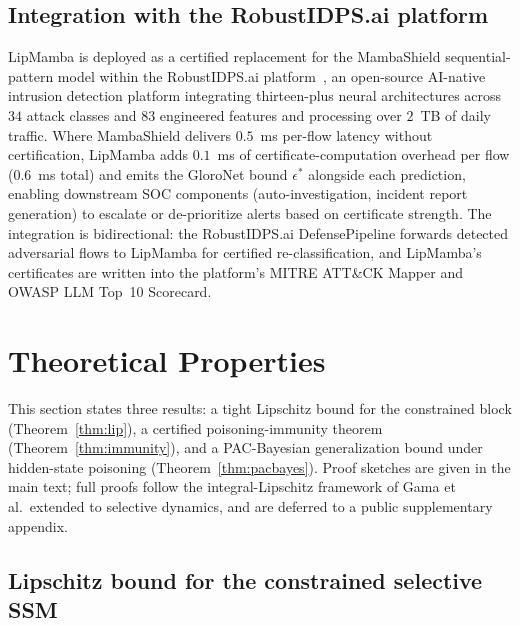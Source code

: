 \documentclass[12pt,a4paper]{article}
\theoremstyle{definition}
\theoremstyle{remark}
\newcommand{\modelname}{LipMamba}
\begin{document}
\subsection{Integration with the RobustIDPS.ai platform}
\label{subsec:platform}

\modelname{} is deployed as a certified replacement for the MambaShield sequential-pattern model within the RobustIDPS.ai platform~\cite{anaedevha2026robustidps}, an open-source AI-native intrusion detection platform integrating thirteen-plus neural architectures across $34$ attack classes and $83$ engineered features and processing over $2$~TB of daily traffic. Where MambaShield delivers $0.5$~ms per-flow latency without certification, \modelname{} adds $0.1$~ms of certificate-computation overhead per flow ($0.6$~ms total) and emits the GloroNet bound $\epsilon^*$ alongside each prediction, enabling downstream SOC components (auto-investigation, incident report generation) to escalate or de-prioritize alerts based on certificate strength. The integration is bidirectional: the RobustIDPS.ai DefensePipeline forwards detected adversarial flows to \modelname{} for certified re-classification, and \modelname{}'s certificates are written into the platform's MITRE ATT\&CK Mapper and OWASP LLM Top~10 Scorecard.


\section{Theoretical Properties}
\label{sec:theory}

This section states three results: a tight Lipschitz bound for the constrained block (Theorem~\ref{thm:lip}), a certified poisoning-immunity theorem (Theorem~\ref{thm:immunity}), and a PAC-Bayesian generalization bound under hidden-state poisoning (Theorem~\ref{thm:pacbayes}). Proof sketches are given in the main text; full proofs follow the integral-Lipschitz framework of Gama et al.\ extended to selective dynamics, and are deferred to a public supplementary appendix.

\subsection{Lipschitz bound for the constrained selective SSM}
\end{document}

